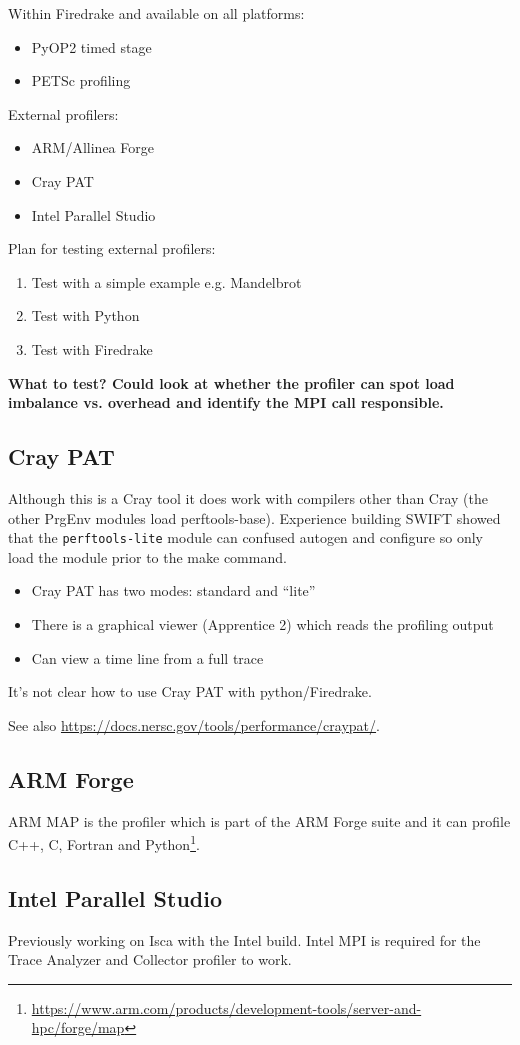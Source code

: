 \documentclass[a4paper,titlepage]{article}
\begin{document}
Within Firedrake and available on all platforms:
\begin{itemize}
\item PyOP2 timed stage
\item PETSc profiling
\end{itemize}
External profilers:
\begin{itemize}
\item ARM/Allinea Forge
\item Cray PAT
\item Intel Parallel Studio
\end{itemize}
%
Plan for testing external profilers:
\begin{enumerate}
\item Test with a simple example e.g. Mandelbrot
\item Test with Python
\item Test with Firedrake
\end{enumerate}

\textbf{What to test? Could look at whether the profiler can spot load imbalance vs. overhead and identify the MPI call responsible.}

\subsection{Cray PAT}

Although this is a Cray tool it does work with compilers other than Cray (the other PrgEnv modules load perftools-base). Experience building SWIFT showed that the \texttt{perftools-lite} module can confused autogen and configure so only load the module prior to the make command. 

\begin{itemize}
\item Cray PAT has two modes: standard and ``lite''
\item There is a graphical viewer (Apprentice 2) which reads the profiling output
\item Can view a time line from a full trace
\end{itemize}

It's not clear how to use Cray PAT with python/Firedrake.

See also \url{https://docs.nersc.gov/tools/performance/craypat/}.

\subsection{ARM Forge}

ARM MAP is the profiler which is part of the ARM Forge suite and it can profile C++, C, Fortran and Python\footnote{\url{https://www.arm.com/products/development-tools/server-and-hpc/forge/map}}.

\subsection{Intel Parallel Studio}

Previously working on Isca with the Intel build. Intel MPI is required for the Trace Analyzer and Collector profiler to work.
\end{document}

